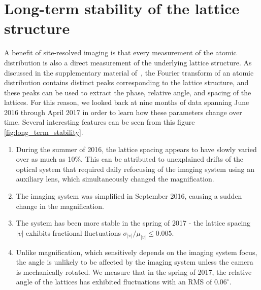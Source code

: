 \documentclass[twocolumn,aps,pra,showpacs,preprintnumbers,bibnotes]{revtex4-1}
\begin{document}
\section{Long-term stability of the lattice structure}
A benefit of site-resolved imaging is that every measurement of the atomic distribution is also a direct measurement of the underlying lattice structure. 
As discussed in the supplementary material of~\cite{Parsons2016, Greif2016}, the Fourier transform of an atomic distribution contains distinct peaks corresponding to the lattice structure, and these peaks can be used to extract the phase, relative angle, and spacing of the lattices.
For this reason, we looked back at nine months of data spanning June 2016 through April 2017 in order to learn how these parameters change over time.
Several interesting features can be seen from this figure \ref{fig:long_term_stability}.
\begin{enumerate}
  \item During the summer of 2016, the lattice spacing appears to have slowly varied over as much as 10\%.
    This can be attributed to unexplained drifts of the optical system that required daily refocusing of the imaging system using an auxiliary lens, which simultaneously changed the magnification. 
  \item The imaging system was simplified in September 2016, causing a sudden change in the magnification. 
  \item The system has been more stable in the spring of 2017 - the lattice spacing $|v|$ exhibits fractional fluctuations $\sigma_{|v|}/\mu_{|v|}\leq 0.005$.
  \item Unlike magnification, which sensitively depends on the imaging system focus, the angle is unlikely to be affected by the imaging system unless the camera is mechanically rotated. We measure that in the spring of 2017, the relative angle of the lattices has exhibited fluctuations with an RMS of $0.06^\circ$.
\end{enumerate}
\end{document}
